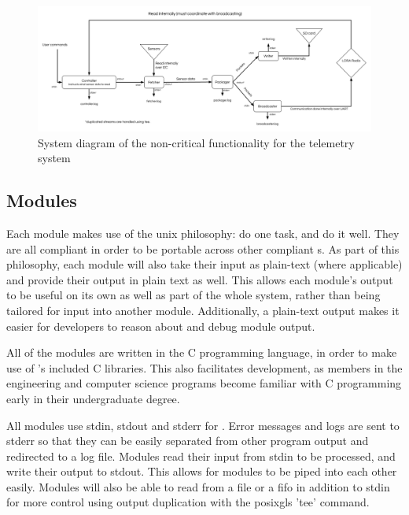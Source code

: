 \begin{figure}[H]
    \includegraphics[width=\linewidth]{assets/non-critical-architecture.png}
    \caption{System diagram of the non-critical functionality for the telemetry system}
    \label{fig:non-crit-arc}
\end{figure}

\subsection{Modules}

Each module makes use of the \gls{unix} philosophy: do one task, and do it well. They are all 
compliant in order to be portable across other  compliant s. As part of this
philosophy, each module will also take their input as plain-text (where applicable) and provide their output in plain
text as well. This allows each module's output to be useful on its own as well as part of the whole system, rather than
being tailored for input into another module. Additionally, a plain-text output makes it easier for developers to
reason about and debug module output.

All of the modules are written in the C programming language, in order to make use of 's included C
libraries. This also facilitates  development, as members in the engineering and computer science
programs become familiar with C programming early in their undergraduate degree.

All modules use \gls{stdin}, \gls{stdout} and \gls{stderr} for . Error messages and logs are sent to
\gls{stderr} so that they can be easily separated from other program output and redirected to a log file. Modules read
their input from \gls{stdin} to be processed, and write their output to \gls{stdout}. This allows for modules to be
piped into each other easily. Modules will also be able to read from a file or a \gls{fifo} in addition to \gls{stdin}
for more control using output duplication with the \gls{posixgls} 'tee' command.

